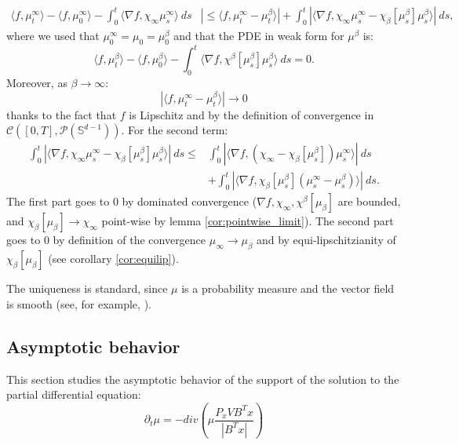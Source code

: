 \documentclass{article}
\numberwithin{theorem}{section}
\begin{document}
\begin{align*}
    \langle f, \mu^\infty_t\rangle - \langle f, \mu^\infty_0\rangle - \int_0^t \langle \nabla f,  \chi_\infty\mu^\infty_s\rangle\ ds & |\leq \langle f, \mu^\infty_t -\mu^\beta_t \rangle| + \int_0^t |\langle \nabla f,  \chi_\infty\mu^\infty_s- \chi_\beta[\mu^\beta_s]\mu^\beta_s\rangle|\ ds,
\end{align*}
where we used that $\mu^\infty_0=\mu_0=\mu^\beta_0$ and that the PDE in weak form for $\mu^\beta$ is:
$$ 
\langle f, \mu^\beta_t\rangle - \langle f, \mu^\beta_0\rangle - \int_0^t \langle \nabla f,  \chi^\beta[\mu^\beta_s]\mu^\beta_s\rangle\ ds = 0.
$$
Moreover, as $\beta \to\infty$:
$$
|\langle f, \mu^\infty_t -\mu^\beta_t \rangle|\to 0
$$
thanks to the fact that $f$ is Lipschitz and by the definition of convergence in $\mathcal{C}([0,T],\mathcal{P}(\mathbb{S}^{d-1}))$. For the second term:
\begin{align*}
\int_0^t |\langle \nabla f,  \chi_\infty\mu^\infty_s- \chi_\beta[\mu^\beta_s]\mu^\beta_s\rangle|\ ds \leq & \int_0^t |\langle \nabla f,  (\chi_\infty- \chi_\beta[\mu^\beta_s])\mu^\infty_s \rangle|\ ds \\
&+\int_0^t |\langle \nabla f, \chi_\beta[\mu^\beta_s](\mu^\infty_s-\mu^\beta_s) \rangle|\ ds .
\end{align*}
The first part goes to $0$ by dominated convergence ($\nabla f,\chi_\infty, \chi^\beta[\mu_\beta]$ are bounded, and $\chi_\beta[\mu_\beta]\to\chi_\infty$ point-wise by lemma \ref{cor:pointwise_limit}). The second part goes to $0$ by definition of the convergence $\mu_\infty\to\mu_\beta$ and by equi-lipschitzianity of $\chi_\beta[\mu_\beta]$ (see corollary \ref{cor:equilip}).

The uniqueness is standard, since $\mu$ is a probability measure and the vector field is smooth (see, for example, \cite{ambrosio2008transport}).

\subsection{Asymptotic behavior}
\label{app:e_max}
This section studies the asymptotic behavior of the support of the solution to the partial differential equation:
\begin{equation}
\label{eq:PVQKapp}
\partial_t \mu = - div\left(\mu \frac{P_x V B^T x}{|B^T x|}\right)
\end{equation}
\end{document}
